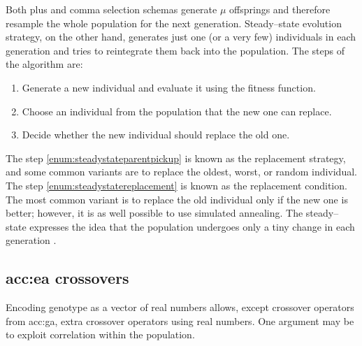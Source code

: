 Both plus and comma selection schemas generate $\mu$ offsprings and therefore resample the whole population for the next generation. Steady--state evolution strategy, on the other hand, generates just one (or a very few) individuals in each generation and tries to reintegrate them back into the population. The steps of the algorithm are:
\begin{enumerate}
    \item Generate a new individual and evaluate it using the fitness function.
    \item\label{enum:steadystateparentpickup} Choose an individual from the population that the new one can replace.
    \item\label{enum:steadystatereplacement} Decide whether the new individual should replace the old one.
\end{enumerate}
The step \ref{enum:steadystateparentpickup} is known as the replacement strategy, and some common variants are to replace the oldest, worst, or random individual. The step \ref{enum:steadystatereplacement} is known as the replacement condition. The most common variant is to replace the old individual only if the new one is better; however, it is as well possible to use simulated annealing.
The steady--state expresses the idea that the population undergoes only a tiny change in each generation \citep{SteadyStateEvolutionStrategy}.

\subsection{\texorpdfstring{\acrshort*{acc:ea} crossovers}{Crossovers}}

Encoding genotype as a vector of real numbers allows, except crossover operators from \acrshort{acc:ga}, extra crossover operators using real numbers. One argument may be to exploit correlation within the population.

